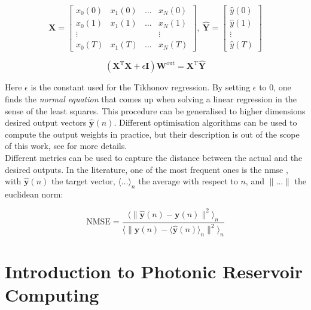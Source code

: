 \begin{equation}
	\mathbf{X} = \begin{bmatrix}
			x_0(0) & x_1(0) & \dots & x_N(0)\\
			x_0(1) & x_1(1) & \dots & x_N(1)\\
			\vdots & & & \vdots \\
			x_0(T) & x_1(T) & \dots & x_N(T)			
	\end{bmatrix},~ \hat{\mathbf{Y}} = \begin{bmatrix}
		\hat{y}(0)\\
		\hat{y}(1)\\
		\vdots \\
		\hat{y}(T)
	\end{bmatrix}
\end{equation} 

\begin{equation}
	\left(\mathbf{X}^{\text{T}} \mathbf{X}+\epsilon \mathbf{I} \right) \mathbf{W}^{\text{out}} = \mathbf{X}^{\text{T}} \hat{\mathbf{Y}}
	\label{ridge-regression}
\end{equation}

Here $\epsilon$ is the constant used for the Tikhonov regression. By setting $\epsilon$ to 0, one finds the \textit{normal equation} that comes up when solving a linear regression \cite{Goudarzi2014ACS} in the sense of the least squares. This procedure can be generalised to higher dimensions desired output vectors $\hat{\mathbf{y}}(n)$. Different optimisation algorithms can be used to compute the output weights in practice, but their description is out of the scope of this work, see \cite{Lukoeviius2009} for more details.\\

Different metrics can be used to capture the distance between the actual and the desired outputs. In the literature, one of the most frequent ones is the \gls{nmse} \cite{Duport2016}, with $\hat{\mathbf{y}}(n)$ the target vector, $\langle \dots \rangle _n$ the average with respect to $n$, and $\| \dots \|$ the euclidean norm:

\begin{equation}
	\text{NMSE} = \frac{\langle \| \hat{\mathbf{y}}(n) - \mathbf{y}(n)\|^2 \rangle _n}{\langle \| \hat{\mathbf{y}}(n) - \langle \hat{\mathbf{y}}(n) \rangle _n \|^2 \rangle _n}
\end{equation}


\section{Introduction to Photonic Reservoir Computing}


